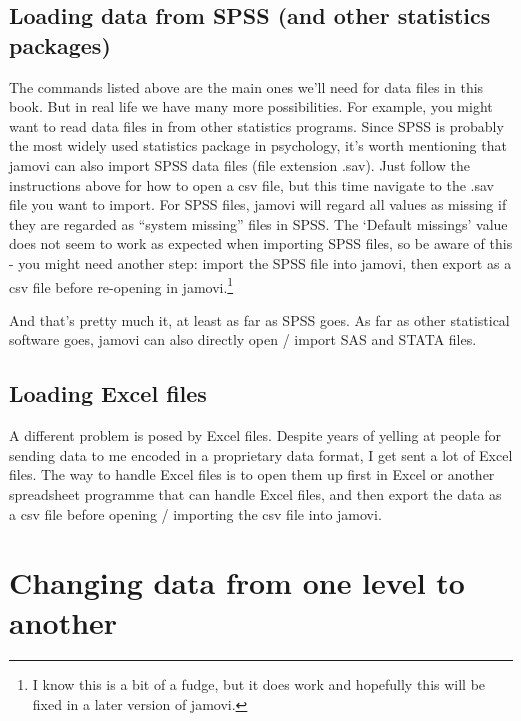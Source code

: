 \documentclass[
  a4paper,
]{book}
\begin{document}
\hypertarget{loading-data-from-spss-and-other-statistics-packages}{%
\subsection{Loading data from SPSS (and other statistics
packages)}\label{loading-data-from-spss-and-other-statistics-packages}}

The commands listed above are the main ones we'll need for data files in
this book. But in real life we have many more possibilities. For
example, you might want to read data files in from other statistics
programs. Since SPSS is probably the most widely used statistics package
in psychology, it's worth mentioning that jamovi can also import SPSS
data files (file extension .sav). Just follow the instructions above for
how to open a csv file, but this time navigate to the .sav file you want
to import. For SPSS files, jamovi will regard all values as missing if
they are regarded as ``system missing'' files in SPSS. The `Default
missings' value does not seem to work as expected when importing SPSS
files, so be aware of this - you might need another step: import the
SPSS file into jamovi, then export as a csv file before re-opening in
jamovi.\footnote{I know this is a bit of a fudge, but it does work and
  hopefully this will be fixed in a later version of jamovi.}

And that's pretty much it, at least as far as SPSS goes. As far as other
statistical software goes, jamovi can also directly open / import SAS
and STATA files.

\hypertarget{loading-excel-files}{%
\subsection{Loading Excel files}\label{loading-excel-files}}

A different problem is posed by Excel files. Despite years of yelling at
people for sending data to me encoded in a proprietary data format, I
get sent a lot of Excel files. The way to handle Excel files is to open
them up first in Excel or another spreadsheet programme that can handle
Excel files, and then export the data as a csv file before opening /
importing the csv file into jamovi.

\hypertarget{sec-Changing-data-from-one-level-to-another}{%
\section{Changing data from one level to
another}\label{sec-Changing-data-from-one-level-to-another}}
\end{document}
